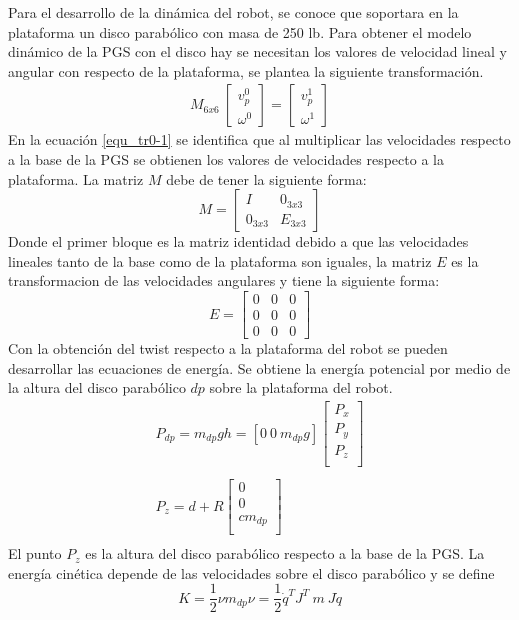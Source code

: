 Para el desarrollo de la dinámica del robot, se conoce que soportara en la plataforma un disco parabólico con masa de 250 lb. Para obtener el modelo dinámico de la PGS con el disco hay se necesitan los valores de velocidad lineal y angular con respecto de la plataforma, se plantea la siguiente transformación.
\begin{equation} \label{equ_tr0-1}
\begin{split}
M_{6x6}\
\begin{bmatrix}
v_p^0\\
\omega^0
\end{bmatrix}  = \begin{bmatrix}
v_p^1\\
\omega^1
\end{bmatrix}
\end{split}
\end{equation}
En la ecuación \ref{equ_tr0-1} se identifica que al multiplicar las velocidades respecto a la base de la PGS se obtienen los valores de velocidades respecto a la plataforma. La matriz $M$ debe de tener la siguiente forma:
\begin{equation}
M = \begin{bmatrix}
I & 0_{3x3} \\
0_{3x3} & E_{3x3}
\end{bmatrix}
\end{equation}
Donde el primer bloque es la matriz identidad debido a que las velocidades lineales tanto de la base como de la plataforma son iguales, la matriz $E$ es la transformacion de las velocidades angulares y tiene la siguiente forma:
\begin{equation*}
E = \begin{bmatrix}
0 & 0 & 0\\
0 & 0 & 0\\
0 & 0 & 0
\end{bmatrix}
\end{equation*}
Con la obtención del twist respecto a la plataforma del robot se pueden desarrollar las ecuaciones de energía. Se obtiene la energía potencial por medio de la altura del disco parabólico $dp$ sobre la plataforma del robot.
\begin{equation}
\begin{split}
P_{dp} = m_{dp}gh = [0\ 0\ m_{dp}g] \begin{bmatrix}
P_x\\
P_y\\
P_z\\
\end{bmatrix}\\
\\
P_z = d + R\begin{bmatrix}
0\\
0\\
cm_{dp}\\
\end{bmatrix}\\
\end{split}
\end{equation}
El punto $P_z$ es la altura del disco parabólico respecto a la base de la PGS. La energía cinética depende de las velocidades sobre el disco parabólico y se define
\begin{equation}
K = \frac{1}{2} \nu m_{dp} \nu = \frac{1}{2} \dot{q}^T J^T\ m\ J \dot{q}
\end{equation}
